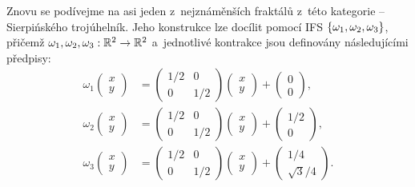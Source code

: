 Znovu se podívejme na asi jeden z~nejznáměnších fraktálů z~této kategorie -- Sierpińského trojúhelník. Jeho konstrukce lze docílit pomocí IFS $\left\{\omega_1,\omega_2,\omega_3\right\}$, přičemž $\omega_1,\omega_2,\omega_3:\mathbb{R}^2 \rightarrow \mathbb{R}^2$ a~jednotlivé kontrakce jsou definovány následujícími předpisy:
\begin{align*}
    \omega_1\left(\begin{matrix}
        x\\
        y
    \end{matrix}\right)&=\left(\begin{matrix}
        1/2 & 0\\
        0 & 1/2
    \end{matrix}\right)\left(\begin{matrix}
        x\\
        y
    \end{matrix}\right)+\left(\begin{matrix}
        0\\
        0
    \end{matrix}\right),\\
    \omega_2\left(\begin{matrix}
        x\\
        y
    \end{matrix}\right)&=\left(\begin{matrix}
        1/2 & 0\\
        0 & 1/2
    \end{matrix}\right)\left(\begin{matrix}
        x\\
        y
    \end{matrix}\right)+\left(\begin{matrix}
        1/2\\
        0
    \end{matrix}\right),\\
    \omega_3\left(\begin{matrix}
        x\\
        y
    \end{matrix}\right)&=\left(\begin{matrix}
        1/2 & 0\\
        0 & 1/2
    \end{matrix}\right)\left(\begin{matrix}
        x\\
        y
    \end{matrix}\right)+\left(\begin{matrix}
        1/4\\
        \sqrt{3}/4
    \end{matrix}\right).
\end{align*}
